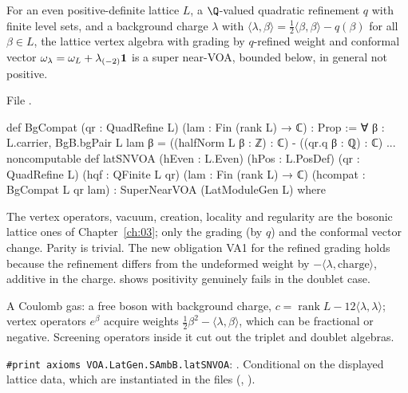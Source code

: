 \begin{theorem}\label{l17:thm:lattice}
For an even positive-definite lattice $L$, a $\Q$-valued quadratic refinement $q$ with finite level
sets, and a background charge $\lambda$ with $\langle\lambda,\beta\rangle=\frac12\langle\beta,\beta\rangle-q(\beta)$
for all $\beta\in L$, the lattice vertex algebra with grading by $q$-refined weight and conformal vector
$\omega_\lambda=\omega_L+\lambda_{(-2)}\mathbf{1}$ is a super near-VOA, bounded below, in general not
positive.
\end{theorem}
\noindent File .
\begin{leancode}
def BgCompat (qr : QuadRefine L) (lam : Fin (rank L) → ℂ) : Prop :=
  ∀ β : L.carrier, BgB.bgPair L lam β = ((halfNorm L β : ℤ) : ℂ) - ((qr.q β : ℚ) : ℂ)
...
noncomputable def latSNVOA (hEven : L.Even) (hPos : L.PosDef) (qr : QuadRefine L)
    (hqf : QFinite L qr) (lam : Fin (rank L) → ℂ) (hcompat : BgCompat L qr lam) :
    SuperNearVOA (LatModuleGen L) where
\end{leancode}
\begin{dictionary}
The vertex operators, vacuum, creation, locality and regularity are the bosonic lattice ones of
Chapter~\ref{ch:03}; only the grading (by $q$) and the conformal vector change. Parity is trivial.
The new obligation VA1 for the refined grading holds because the refinement differs from the
undeformed weight by $-\langle\lambda,\text{charge}\rangle$, additive in the charge.
 shows positivity genuinely fails in the doublet case.
\end{dictionary}
\begin{physics}
A Coulomb gas: a free boson with background charge, $c=\operatorname{rank}L-12\langle\lambda,\lambda\rangle$;
vertex operators $e^{\beta}$ acquire weights $\frac12\beta^2-\langle\lambda,\beta\rangle$, which can be
fractional or negative. Screening operators inside it cut out the triplet and doublet algebras.
\end{physics}
\begin{status}
\texttt{\#print axioms VOA.LatGen.SAmbB.latSNVOA}: . Conditional on the displayed
lattice data, which are instantiated in the files (, ).
\end{status}

